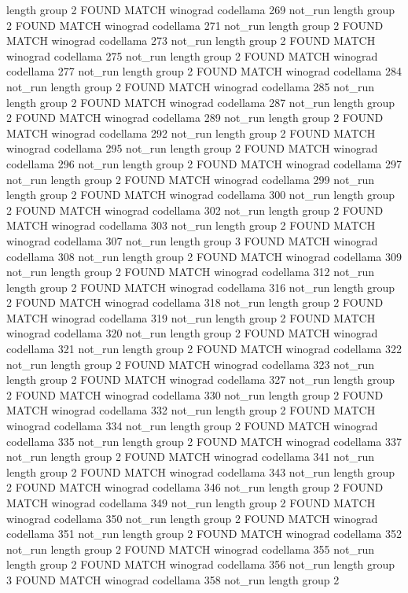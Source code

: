 length group  2
FOUND MATCH winograd codellama 269 not_run
length group  2
FOUND MATCH winograd codellama 271 not_run
length group  2
FOUND MATCH winograd codellama 273 not_run
length group  2
FOUND MATCH winograd codellama 275 not_run
length group  2
FOUND MATCH winograd codellama 277 not_run
length group  2
FOUND MATCH winograd codellama 284 not_run
length group  2
FOUND MATCH winograd codellama 285 not_run
length group  2
FOUND MATCH winograd codellama 287 not_run
length group  2
FOUND MATCH winograd codellama 289 not_run
length group  2
FOUND MATCH winograd codellama 292 not_run
length group  2
FOUND MATCH winograd codellama 295 not_run
length group  2
FOUND MATCH winograd codellama 296 not_run
length group  2
FOUND MATCH winograd codellama 297 not_run
length group  2
FOUND MATCH winograd codellama 299 not_run
length group  2
FOUND MATCH winograd codellama 300 not_run
length group  2
FOUND MATCH winograd codellama 302 not_run
length group  2
FOUND MATCH winograd codellama 303 not_run
length group  2
FOUND MATCH winograd codellama 307 not_run
length group  3
FOUND MATCH winograd codellama 308 not_run
length group  2
FOUND MATCH winograd codellama 309 not_run
length group  2
FOUND MATCH winograd codellama 312 not_run
length group  2
FOUND MATCH winograd codellama 316 not_run
length group  2
FOUND MATCH winograd codellama 318 not_run
length group  2
FOUND MATCH winograd codellama 319 not_run
length group  2
FOUND MATCH winograd codellama 320 not_run
length group  2
FOUND MATCH winograd codellama 321 not_run
length group  2
FOUND MATCH winograd codellama 322 not_run
length group  2
FOUND MATCH winograd codellama 323 not_run
length group  2
FOUND MATCH winograd codellama 327 not_run
length group  2
FOUND MATCH winograd codellama 330 not_run
length group  2
FOUND MATCH winograd codellama 332 not_run
length group  2
FOUND MATCH winograd codellama 334 not_run
length group  2
FOUND MATCH winograd codellama 335 not_run
length group  2
FOUND MATCH winograd codellama 337 not_run
length group  2
FOUND MATCH winograd codellama 341 not_run
length group  2
FOUND MATCH winograd codellama 343 not_run
length group  2
FOUND MATCH winograd codellama 346 not_run
length group  2
FOUND MATCH winograd codellama 349 not_run
length group  2
FOUND MATCH winograd codellama 350 not_run
length group  2
FOUND MATCH winograd codellama 351 not_run
length group  2
FOUND MATCH winograd codellama 352 not_run
length group  2
FOUND MATCH winograd codellama 355 not_run
length group  2
FOUND MATCH winograd codellama 356 not_run
length group  3
FOUND MATCH winograd codellama 358 not_run
length group  2
